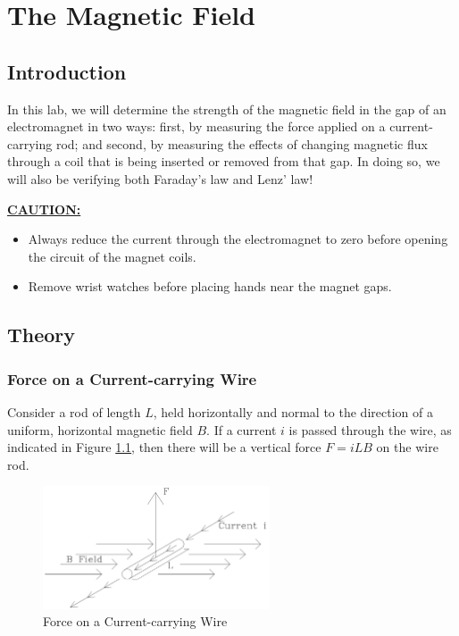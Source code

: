 \chapter{The Magnetic Field}

\section{Introduction}

In this lab, we will determine the strength of the magnetic field in the gap of an electromagnet in two ways: first, by measuring the force applied on a current-carrying rod; and second, by measuring the effects of changing magnetic flux through a coil that is being inserted or removed from that gap. In doing so, we will also be verifying both Faraday's law and Lenz' law! \myskip

\underline{\textbf{CAUTION:}}
\begin{itemize}
  \item Always reduce the current through the electromagnet to zero before opening the circuit of the magnet coils.
  \item Remove wrist watches before placing hands near the magnet gaps.
\end{itemize}

\section{Theory}
\subsection{Force on a Current-carrying Wire}
Consider a rod of length $L$, held horizontally and normal to the direction of a uniform, horizontal magnetic field $B$. If a current $i$ is passed through the wire, as indicated in Figure {\ref{fig:force}}, then there will be a vertical force $F=iLB$ on the wire rod.
\begin{figure}[h]
\centering
\includegraphics[width=0.6\textwidth]{./Exp4/pic/image1.png}
\caption{Force on a Current-carrying Wire}
\label{fig:force}
\end{figure}

